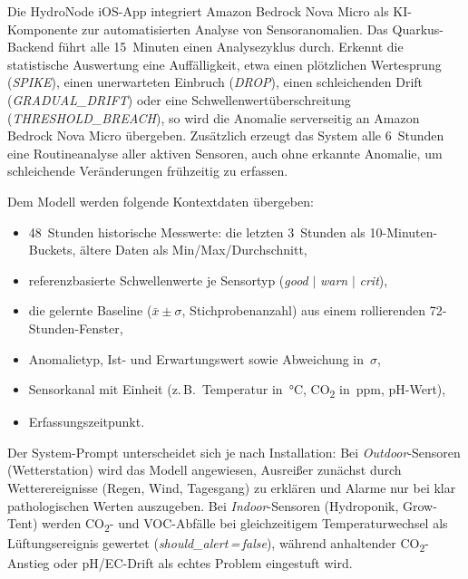   Die HydroNode iOS-App integriert Amazon Bedrock Nova Micro als KI-Komponente zur
  automatisierten Analyse von Sensoranomalien. Das Quarkus-Backend führt alle
  15~Minuten einen Analysezyklus durch. Erkennt die statistische Auswertung eine
  Auffälligkeit, etwa einen plötzlichen Wertesprung (\emph{SPIKE}), einen
  unerwarteten Einbruch (\emph{DROP}), einen schleichenden Drift
  (\emph{GRADUAL\_DRIFT}) oder eine Schwellenwertüberschreitung
  (\emph{THRESHOLD\_BREACH}), so wird die Anomalie serverseitig an Amazon Bedrock
  Nova Micro übergeben. Zusätzlich erzeugt das System alle 6~Stunden eine
  Routineanalyse aller aktiven Sensoren, auch ohne erkannte Anomalie, um
  schleichende Veränderungen frühzeitig zu erfassen.

  Dem Modell werden folgende Kontextdaten übergeben:

  \begin{itemize}
    \item 48~Stunden historische Messwerte: die letzten 3~Stunden als
          10-Minuten-Buckets, ältere Daten als Min/Max/Durchschnitt,
    \item referenzbasierte Schwellenwerte je Sensortyp
          (\emph{good} $|$ \emph{warn} $|$ \emph{crit}),
    \item die gelernte Baseline (\(\bar{x} \pm \sigma\), Stichprobenanzahl) aus
          einem rollierenden 72-Stunden-Fenster,
    \item Anomalietyp, Ist- und Erwartungswert sowie Abweichung in~$\sigma$,
    \item Sensorkanal mit Einheit (z.\,B.\ Temperatur in~°C,
          CO\textsubscript{2} in~ppm, pH-Wert),
    \item Erfassungszeitpunkt.
  \end{itemize}

  Der System-Prompt unterscheidet sich je nach Installation: Bei
  \emph{Outdoor}-Sensoren (Wetterstation) wird das Modell angewiesen,
  Ausreißer zunächst durch Wetterereignisse (Regen, Wind, Tagesgang) zu erklären
  und Alarme nur bei klar pathologischen Werten auszugeben.
  Bei \emph{Indoor}-Sensoren (Hydroponik, Grow-Tent) werden CO\textsubscript{2}-
  und VOC-Abfälle bei gleichzeitigem Temperaturwechsel als Lüftungsereignis
  gewertet (\emph{should\_alert\,=\,false}), während anhaltender
  CO\textsubscript{2}-Anstieg oder pH/EC-Drift als echtes Problem eingestuft wird.

